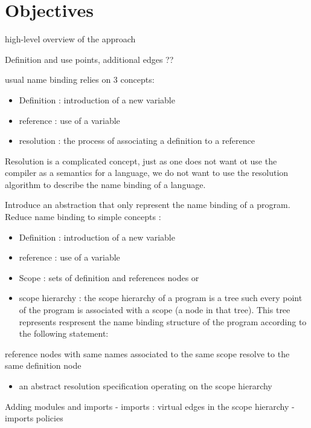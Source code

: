 \section{Objectives}\label{objectives}

high-level overview of the approach

Definition and use points, additional edges ??

usual name binding relies on 3 concepts:

\begin{itemize}
\itemsep1pt\parskip0pt
\item
  Definition : introduction of a new variable
\item
  reference : use of a variable
\item
  resolution : the process of associating a definition to a reference
\end{itemize}

Resolution is a complicated concept, just as one does not want ot use
the compiler as a semantics for a language, we do not want to use the
resolution algorithm to describe the name binding of a language.

Introduce an abstraction that only represent the name binding of a
program. Reduce name binding to simple concepts :

\begin{itemize}
\item
  Definition : introduction of a new variable
\item
  reference : use of a variable
\item
  Scope : sets of definition and references nodes or
\item
  scope hierarchy : the scope hierarchy of a program is a tree such
  every point of the program is associated with a scope (a node in that
  tree). This tree represents respresent the name binding structure of
  the program according to the following statement:
\end{itemize}

reference nodes with same names associated to the same scope resolve to
the same definition node

\begin{itemize}
\itemsep1pt\parskip0pt
\item
  an abstract resolution specification operating on the scope hierarchy
\end{itemize}

Adding modules and imports - imports : virtual edges in the scope
hierarchy - imports policies

